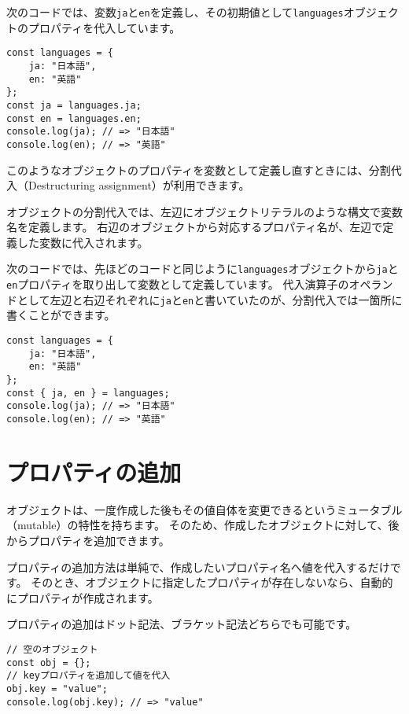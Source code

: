 次のコードでは、変数\texttt{ja}と\texttt{en}を定義し、その初期値として\texttt{languages}オブジェクトのプロパティを代入しています。

\begin{lstlisting}
const languages = {
    ja: "日本語",
    en: "英語"
};
const ja = languages.ja;
const en = languages.en;
console.log(ja); // => "日本語"
console.log(en); // => "英語"
\end{lstlisting}

このようなオブジェクトのプロパティを変数として定義し直すときには、分割代入（Destructuring
assignment）が利用できます。

オブジェクトの分割代入では、左辺にオブジェクトリテラルのような構文で変数名を定義します。
右辺のオブジェクトから対応するプロパティ名が、左辺で定義した変数に代入されます。

次のコードでは、先ほどのコードと同じように\texttt{languages}オブジェクトから\texttt{ja}と\texttt{en}プロパティを取り出して変数として定義しています。
代入演算子のオペランドとして左辺と右辺それぞれに\texttt{ja}と\texttt{en}と書いていたのが、分割代入では一箇所に書くことができます。

\begin{lstlisting}
const languages = {
    ja: "日本語",
    en: "英語"
};
const { ja, en } = languages;
console.log(ja); // => "日本語"
console.log(en); // => "英語"
\end{lstlisting}

\hypertarget{add-property}{%
\section{プロパティの追加}\label{add-property}}

オブジェクトは、一度作成した後もその値自体を変更できるというミュータブル（mutable）の特性を持ちます。
そのため、作成したオブジェクトに対して、後からプロパティを追加できます。

プロパティの追加方法は単純で、作成したいプロパティ名へ値を代入するだけです。
そのとき、オブジェクトに指定したプロパティが存在しないなら、自動的にプロパティが作成されます。

プロパティの追加はドット記法、ブラケット記法どちらでも可能です。

\begin{lstlisting}
// 空のオブジェクト
const obj = {};
// keyプロパティを追加して値を代入
obj.key = "value";
console.log(obj.key); // => "value"
\end{lstlisting}

